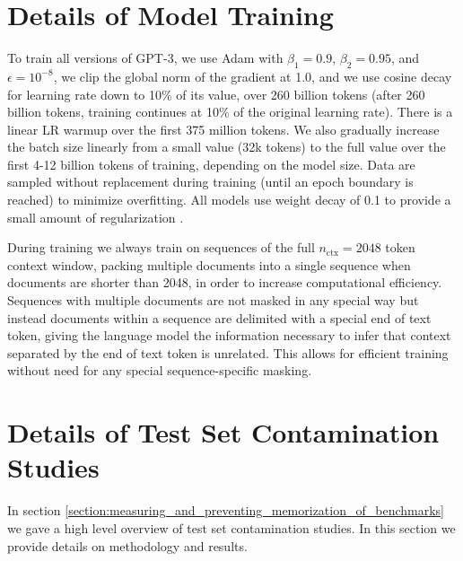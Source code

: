 \documentclass{article}
\begin{document}
\section{Details of Model Training}
\label{appendix:model_training}
To train all versions of GPT-3, we use Adam with $\beta_1=0.9$, $\beta_2=0.95$, and $\epsilon=10^{-8}$, we clip the global norm of the gradient at 1.0, and we use cosine decay for learning rate down to 10\% of its value, over 260 billion tokens (after 260 billion tokens, training continues at 10\% of the original learning rate).  There is a linear LR warmup over the first 375 million tokens.  We also gradually increase the batch size linearly from a small value (32k tokens) to the full value over the first 4-12 billion tokens of training, depending on the model size.  Data are sampled without replacement during training (until an epoch boundary is reached) to minimize overfitting. All models use weight decay of 0.1 to provide a small amount of regularization \cite{loshchilov2017decoupled}.

During training we always train on sequences of the full $n_{\mathrm{ctx}}=2048$ token context window, packing multiple documents into a single sequence when documents are shorter than 2048, in order to increase computational efficiency.  Sequences with multiple documents are not masked in any special way but instead documents within a sequence are delimited with a special end of text token, giving the language model the information necessary to infer that context separated by the end of text token is unrelated.  This allows for efficient training without need for any special sequence-specific masking.
\section{Details of Test Set Contamination Studies}
\label{appendix:test_set_contamination}
In section \ref{section:measuring_and_preventing_memorization_of_benchmarks} we gave a high level overview of test set contamination studies. In this section we provide details on methodology and results.
\end{document}

